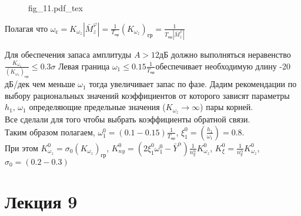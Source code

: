\documentclass{article}
\begin{document}
\begin{figure}[H]
	\centering
	{fig_11.pdf_tex}
\end{figure}


Полагая что $\omega_\text{с} = K_{\omega_z} | \bar{M}_z^\varphi| =
	\frac{1}{T_\text{пр}}
	(K_{\omega_z})_\text{гр} = \frac{1}{T_\text{пр}|\bar{M}_z^\varphi|}$

Для обеспечения запаса амплитуды $A > 12 \text{дБ}$ должно выполняться
неравенство $\frac{K_{\omega_z}}{(K_{\omega_z})_\text{гр}} \leq 0.3 \sigma $
Левая граница $\omega_1 \leq 0.15 \frac{1}{T_\text{пр}}$обеспечивает
необходимую длину -20 дБ/дек чем меньше $\omega_1$ тогда увеличивает запас по
фазе.
Дадим рекомендации по выбору рациональных значений коэффициентов от которого
зависят параметры $h_1, \, \omega_1$ определяющие предельные значения
($K_{\omega_z} \rightarrow\infty$) пары корней.\\
Все сделали для того чтобы выбрать коэффициенты обратной связи. \\
Таким образом полагаем, $\omega_1^0 = (0.1 - 0.15) \frac{1}{T_\text{пр}}$,
$\xi_1^0 = (\frac{h_1}{\omega_1}) = 0.8$.\\
При этом $K_{\omega_z}^0 = \sigma_0 (K_{\omega_z})_\text{гр}$, $K_{ny}^0 =
	(2\xi_1^0 \omega_1^0 - \bar{Y}^\alpha) \frac{1}{n_y^\alpha} K_{\omega_z}^0$,
$K_{\xi}^0 = \frac{1}{n_y^\alpha} K_{\omega_z}^0$, $\sigma_0 = (0.2 - 0.3)$
\newpage
\section{Лекция 9}
\end{document}
